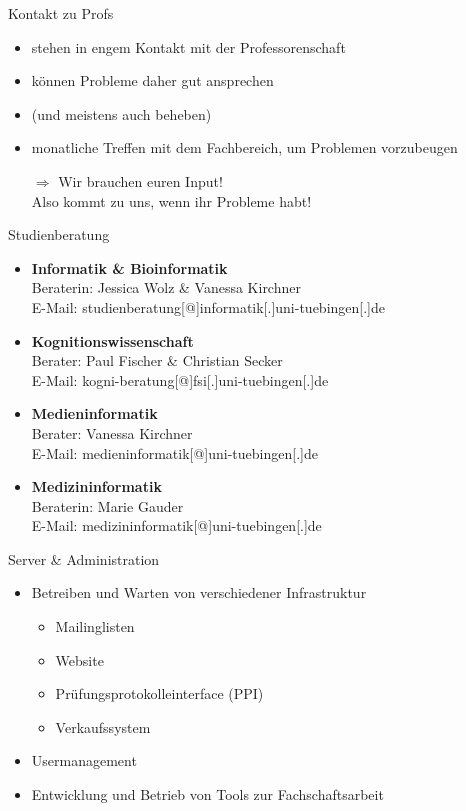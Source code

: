 \documentclass{beamer}
\begin{document}
	\begin{frame}{Kontakt zu Profs}
		\begin{itemize}
			\item stehen in engem Kontakt mit der Professorenschaft
			\item können Probleme daher gut ansprechen
			\item (und meistens auch beheben)
			\item monatliche Treffen mit dem Fachbereich, um Problemen vorzubeugen
			\item[$\Rightarrow$] Wir brauchen euren Input!\\Also kommt zu uns, wenn ihr Probleme habt!
		\end{itemize}
	\end{frame}
	
	\begin{frame}{Studienberatung}
		\begin{itemize}			
			\item \textbf{Informatik \& Bioinformatik}\\			
			Beraterin: Jessica Wolz \& Vanessa Kirchner\\
			E-Mail: studienberatung[@]informatik[.]uni-tuebingen[.]de
			
			\item \textbf{Kognitionswissenschaft}\\	
			Berater: Paul Fischer \& Christian Secker\\
			E-Mail: kogni-beratung[@]fsi[.]uni-tuebingen[.]de
			
			\item \textbf{Medieninformatik}\\
			Berater: Vanessa Kirchner\\
			E-Mail: medieninformatik[@]uni-tuebingen[.]de\\
			
			\item \textbf{Medizininformatik}\\			
			Beraterin: Marie Gauder\\
			E-Mail: medizininformatik[@]uni-tuebingen[.]de
			
		\end{itemize}
	\end{frame}

	\begin{frame}{Server \& Administration}
		\begin{itemize}			
			\item Betreiben und Warten von verschiedener Infrastruktur
			\begin{itemize}
				\item Mailinglisten
				\item Website
				\item Prüfungsprotokolleinterface (PPI)
				\item Verkaufssystem
			\end{itemize}
			\item Usermanagement
			\item Entwicklung und Betrieb von Tools zur Fachschaftsarbeit
		\end{itemize}
	\end{frame}
	
\end{document}
